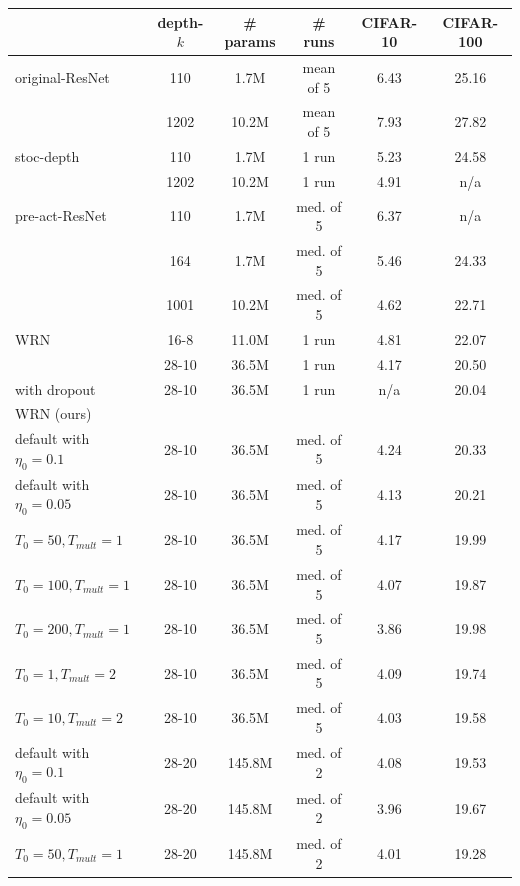 \documentclass{article} %
\begin{document}
\begin{table}[t]
\renewcommand{\arraystretch}{1.2}
\begin{center}
  \begin{tabular}{ l | c | c | c | c | c }
    \hline
				& depth-$k$ & \# params & \# runs  & CIFAR-10 & CIFAR-100 \\ \hline
    original-ResNet \citep{he2015deep} & 110 & 1.7M & mean of 5	& 6.43 &  25.16 \\ 
		& 1202 & 10.2M & mean of 5	& 7.93 &   27.82 \\ \hline
		stoc-depth 	\citep{huang2016deep}		& 110 & 1.7M & 1 run	 & 5.23 &  24.58 \\ 
										& 1202 & 10.2M & 1 run	&  4.91 &   n/a \\ \hline
		pre-act-ResNet \citep{he2016identity} 	& 110 & 1.7M & med. of 5	& 6.37 &   n/a \\ 
									  & 164 & 1.7M & med. of 5	& 5.46 &   24.33 \\ 
										& 1001 & 10.2M & med. of 5	& 4.62 &  22.71 \\ \hline								
    WRN \citep{zagoruyko2016wide}	& 16-8 & 11.0M & 1 run	& 4.81 & 22.07 \\
										& 28-10 &  36.5M  & 1 run	& 4.17 &  20.50 \\
		with dropout		& 28-10 &  36.5M  & 1 run & n/a &  20.04 \\ \hline	
		WRN (ours)			&   &    &   &   \\
		default with $\eta_0=0.1$		& 28-10 &  36.5M & med. of 5		   & 4.24 & 20.33 \\
		default with $\eta_0=0.05$	& 28-10 &  36.5M & med. of 5			& 4.13 & 20.21 \\
		$T_0=50, T_{mult}=1$	& 28-10 &  36.5M & med. of 5		& 4.17 & 19.99 \\
		$T_0=100, T_{mult}=1$	& 28-10 &  36.5M & med. of 5			& 4.07 & 19.87 \\
		$T_0=200, T_{mult}=1$	& 28-10 &  36.5M & med. of 5			& 3.86 & 19.98 \\
		$T_0=1, T_{mult}=2$		& 28-10 &  36.5M & med. of 5		& 4.09 & 19.74 \\
		$T_0=10, T_{mult}=2$	& 28-10 &  36.5M & med. of 5			& 4.03 & 19.58 \\ \hline	
		default with $\eta_0=0.1$		& 28-20 &  145.8M & med. of 2		   & 4.08 & 19.53 \\
		default with $\eta_0=0.05$	& 28-20 &  145.8M & med. of 2			& 3.96 & 19.67 \\
		$T_0=50, T_{mult}=1$	& 28-20 &  145.8M & med. of 2		& 4.01 & 19.28 \\

\end{tabular}
\end{center}
\end{table}
\end{document}
